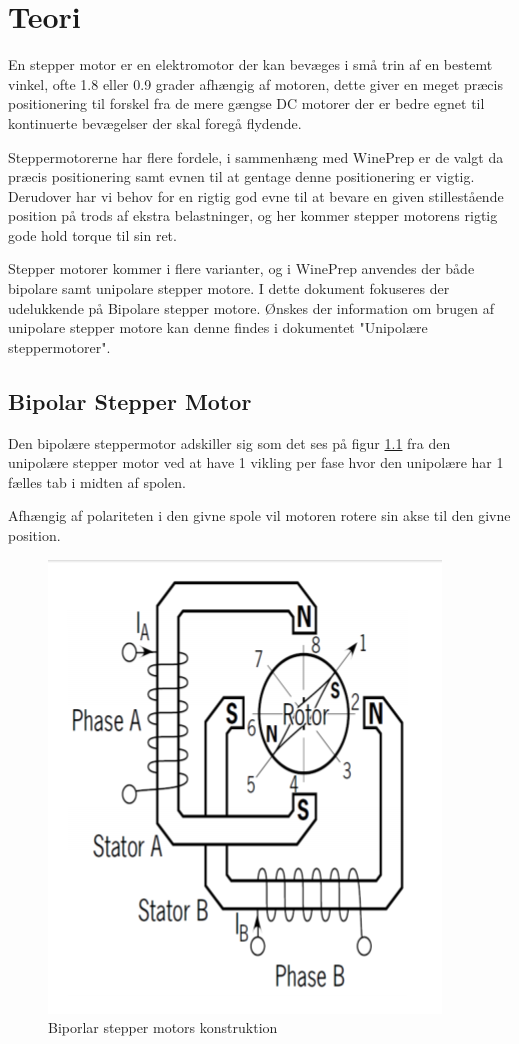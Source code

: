 ﻿\chapter{Teori}

En stepper motor er en elektromotor der kan bevæges i små trin af en bestemt vinkel, ofte 1.8 eller 0.9 grader afhængig af motoren, dette giver en meget præcis positionering til forskel fra de mere gængse DC motorer der er bedre egnet til kontinuerte bevægelser der skal foregå flydende.

Steppermotorerne har flere fordele, i sammenhæng med WinePrep er de valgt da præcis positionering samt evnen til at gentage denne positionering er vigtig. Derudover har vi behov for en rigtig god evne til at bevare en given stillestående position på trods af ekstra belastninger, og her kommer stepper motorens rigtig gode hold torque til sin ret.

Stepper motorer kommer i flere varianter, og i WinePrep anvendes der både bipolare samt unipolare stepper motore. I dette dokument fokuseres der udelukkende på Bipolare stepper motore. Ønskes der information om brugen af unipolare stepper motore kan denne findes i dokumentet "Unipolære steppermotorer".

\section{Bipolar Stepper Motor}

Den bipolære steppermotor adskiller sig som det ses på figur \ref{bipolarlayout} fra den unipolære stepper motor ved at have 1 vikling per fase hvor den unipolære har 1 fælles tab i midten af spolen.

Afhængig af polariteten i den givne spole vil motoren rotere sin akse til den givne position.

\begin{figure}[H]
	\centering
	\includegraphics{billeder/konstruktion}
	\caption{Biporlar stepper motors konstruktion}
	\label{bipolarlayout}
\end{figure}

